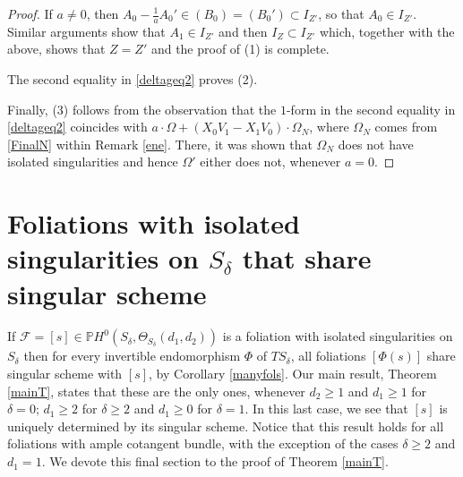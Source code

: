 \documentclass{amsart} %
\theoremstyle{definition}
\newcommand{\cts}{\Theta_{S_{\delta}}}
\newcommand{\cs}{S_{\delta}}
\newcommand{\PP}{\mathbb{P}}
\newcommand{\mcF}{\mathcal{F}}
\begin{document}
\begin{proof}
 If $ a \neq 0 $, then $ A_0 - \frac{1}{a} A_0' \in ( B_0 ) = ( B_0' ) \subset I_{Z'} $,
 so that $ A_0 \in I_{Z'} $. Similar arguments show that $ A_1 \in I_{Z'} $ and then
 $ I_{Z} \subset I_{Z'} $ which, together with the above, shows that $ Z = Z' $ and the proof of (1) is complete.


The second equality in \eqref{deltageq2} proves (2).

Finally, (3) follows from the observation that the $1$-form in the second equality in \eqref{deltageq2}
coincides with $ a\cdot\Omega + (X_0 V_1 - X_1 V_0) \cdot \Omega_N $, where $ \Omega_N $ comes from
\eqref{FinalN} within Remark \ref{ene}. There, it was shown that $\Omega_N $ does not have isolated
singularities and hence $ \Omega' $ either does not, whenever $ a = 0 $.
\end{proof}


\section{Foliations with isolated singularities on $S_{\delta}$ that share singular scheme} \label{La5}


If $ \mcF = [s] \in \PP H^{0}( S_{\delta}, \cts(d_1,d_2) ) $ is a foliation with isolated singularities on $ \cs $  then for every invertible endomorphism $ \Phi $ of $ T\cs $, all foliations $ [\Phi(s)] $ share singular scheme with $ [s] $, by Corollary \ref{manyfols}. Our main result, Theorem \ref{mainT}, states that these are the only ones, whenever $ d_2 \geq 1 $ and
 $ d_1 \geq 1 $ for $ \delta = 0 $;
 $ d_1 \geq 2 $ for $ \delta \geq 2 $ and
 $ d_1 \geq 0 $ for $ \delta = 1 $. In this last case, we see that $ [s] $ is uniquely determined by its
 singular scheme. Notice that this result holds for all foliations with ample cotangent bundle, with the exception of the cases $\delta \geq 2$ and $d_1=1$. We devote this final section to the proof of Theorem \ref{mainT}.

\end{document}
